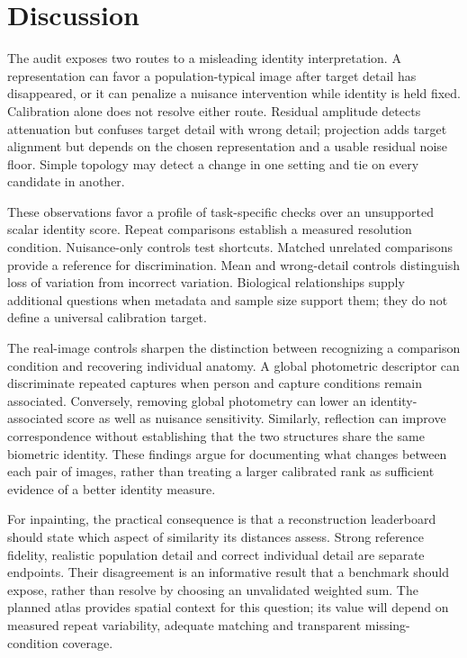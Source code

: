 \documentclass[10pt,twocolumn,letterpaper]{article}
\begin{document}
\section{Discussion}
The audit exposes two routes to a misleading identity interpretation. A representation can favor a population-typical image after target detail has disappeared, or it can penalize a nuisance intervention while identity is held fixed. Calibration alone does not resolve either route. Residual amplitude detects attenuation but confuses target detail with wrong detail; projection adds target alignment but depends on the chosen representation and a usable residual noise floor. Simple topology may detect a change in one setting and tie on every candidate in another.

These observations favor a profile of task-specific checks over an unsupported scalar identity score. Repeat comparisons establish a measured resolution condition. Nuisance-only controls test shortcuts. Matched unrelated comparisons provide a reference for discrimination. Mean and wrong-detail controls distinguish loss of variation from incorrect variation. Biological relationships supply additional questions when metadata and sample size support them; they do not define a universal calibration target.

The real-image controls sharpen the distinction between recognizing a comparison condition and recovering individual anatomy. A global photometric descriptor can discriminate repeated captures when person and capture conditions remain associated. Conversely, removing global photometry can lower an identity-associated score as well as nuisance sensitivity. Similarly, reflection can improve correspondence without establishing that the two structures share the same biometric identity. These findings argue for documenting what changes between each pair of images, rather than treating a larger calibrated rank as sufficient evidence of a better identity measure.

For inpainting, the practical consequence is that a reconstruction leaderboard should state which aspect of similarity its distances assess. Strong reference fidelity, realistic population detail and correct individual detail are separate endpoints. Their disagreement is an informative result that a benchmark should expose, rather than resolve by choosing an unvalidated weighted sum. The planned atlas provides spatial context for this question; its value will depend on measured repeat variability, adequate matching and transparent missing-condition coverage.
\end{document}
